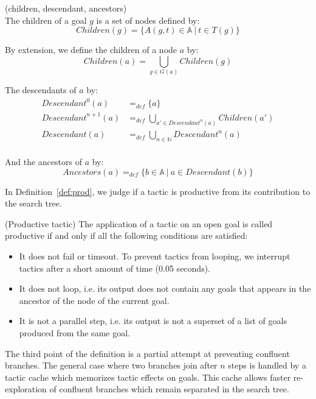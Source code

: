 \documentclass[runningheads,a4paper,draft]{svjour3}
\begin{document}
\begin{definition}\label{def:desc}(children, descendant, ancestors)\\
The children of a goal $g$ is a set of nodes defined by:
\[\mathit{Children}(g) = \lbrace A(g,t)\in \mathbb{A}\ |\ t \in T(g) \rbrace\]

By extension, we define the children of a node $a$ by:
\[\mathit{Children}(a) = \bigcup_{g \in G(a)} \mathit{Children}(g) \]

The descendants of $a$ by:
\begin{align*}
\mathit{Descendant}^{0}(a) &=_{def} \lbrace a \rbrace \\
\mathit{Descendant}^{n+1}(a) &=_{def} \bigcup_{a' \in \mathit{Descendant}^{n}(a)}
\mathit{Children}(a') \\
\mathit{Descendant}(a) &=_{def} \bigcup_{n \in \mathbb{N}} \mathit{Descendant}^n(a)\\
\end{align*}

And the ancestors of $a$ by:
\[\mathit{Ancestors}(a) =_{def} \lbrace b \in \mathbb{A} \ | \ a \in
Descendant(b) \rbrace\]

\end{definition}


In Definition~\ref{def:prod}, we judge if a tactic is productive from its 
contribution to the search tree.

\begin{definition}\label{def:prod} (Productive tactic)
The application of a tactic on an open goal is called productive if and only if
all the following conditions are satisfied:
\begin{itemize}
\item It does not fail or timeout. To prevent tactics from looping, we
interrupt tactics after a short amount of time (0.05 seconds).
\item It does not loop, i.e. its output does not contain any goals that appears 
in the ancestor of the node of the current goal.
\item It is not a parallel step, i.e. its output is not a superset
of a list of goals produced from the same goal.
\end{itemize}

The third point of the definition is a partial attempt at preventing confluent
branches. The general case where two branches join after $n$ steps is handled
by a tactic cache which memorizes tactic effects on goals. This
cache allows faster re-exploration of confluent branches which remain
separated in the search tree.
\end{definition}
\end{document}
